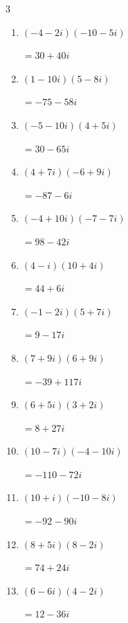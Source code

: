 \begin{multicols}{3}
\begin{enumerate}
        $\displaystyle =-31-7i$

  \item $\displaystyle (-4-2i)(-10-5i)$

        $\displaystyle =30+40i$

  \item $\displaystyle (1-10i)(5-8i)$

        $\displaystyle =-75-58i$

  \item $\displaystyle (-5-10i)(4+5i)$

        $\displaystyle =30-65i$

  \item $\displaystyle (4+7i)(-6+9i)$

        $\displaystyle =-87-6i$

  \item $\displaystyle (-4+10i)(-7-7i)$

        $\displaystyle =98-42i$

  \item $\displaystyle (4-i)(10+4i)$

        $\displaystyle =44+6i$

  \item $\displaystyle (-1-2i)(5+7i)$

        $\displaystyle =9-17i$

  \item $\displaystyle (7+9i)(6+9i)$

        $\displaystyle =-39+117i$

  \item $\displaystyle (6+5i)(3+2i)$

        $\displaystyle =8+27i$

  \item $\displaystyle (10-7i)(-4-10i)$

        $\displaystyle =-110-72i$

  \item $\displaystyle (10+i)(-10-8i)$

        $\displaystyle =-92-90i$

\columnbreak %

  \item $\displaystyle (8+5i)(8-2i)$

        $\displaystyle =74+24i$

  \item $\displaystyle (6-6i)(4-2i)$

        $\displaystyle =12-36i$


\end{enumerate}
\end{multicols}

